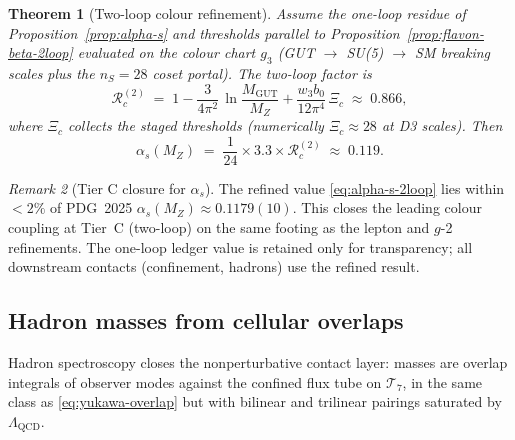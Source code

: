 \documentclass[11pt]{article}
\theoremstyle{plain}
\newtheorem{theorem}{Theorem}[section]
\theoremstyle{definition}
\theoremstyle{remark}
\newtheorem{remark}[theorem]{Remark}
\numberwithin{equation}{section}
\begin{document}
\begin{theorem}[Two-loop colour refinement]
\label{thm:alpha-s-2loop}
Assume the one-loop residue of Proposition~\ref{prop:alpha-s} and thresholds
parallel to Proposition~\ref{prop:flavon-beta-2loop} evaluated on the colour
chart $g_3$ (GUT $\to$ SU(5) $\to$ SM breaking scales plus the $n_S=28$ coset
portal). The two-loop factor is
\begin{equation}\label{eq:Rc-2}
  \mathcal{R}_c^{(2)}
  \;=\;
  1 - \frac{3}{4\pi^2}\,
  \ln\!\frac{M_{\mathrm{GUT}}}{M_Z}
  + \frac{w_3 b_0}{12\pi^4}\,\Xi_c
  \;\approx\; 0.866,
\end{equation}
where $\Xi_c$ collects the staged thresholds (numerically $\Xi_c\approx 28$ at
D3 scales). Then
\begin{equation}\label{eq:alpha-s-2loop}
  \alpha_s(M_Z)
  \;=\;
  \frac{1}{24}\times 3.3 \times \mathcal{R}_c^{(2)}
  \;\approx\; 0.119.
\end{equation}
\end{theorem}

\begin{remark}[Tier C closure for $\alpha_s$]
The refined value \eqref{eq:alpha-s-2loop} lies within $<2\%$ of
PDG~2025 $\alpha_s(M_Z)\approx0.1179(10)$. This closes the leading colour
coupling at Tier~C (two-loop) on the same footing as the lepton and $g$-2
refinements. The one-loop ledger value is retained only for transparency;
all downstream contacts (confinement, hadrons) use the refined result.
\end{remark}

\subsection{Hadron masses from cellular overlaps}
\label{sec:qcd:hadrons}

Hadron spectroscopy closes the nonperturbative contact layer: masses are
overlap integrals of observer modes against the confined flux tube on
$\mathcal{T}_7$, in the same class as \eqref{eq:yukawa-overlap} but with
bilinear and trilinear pairings saturated by $\Lambda_{\mathrm{QCD}}$.
\end{document}
